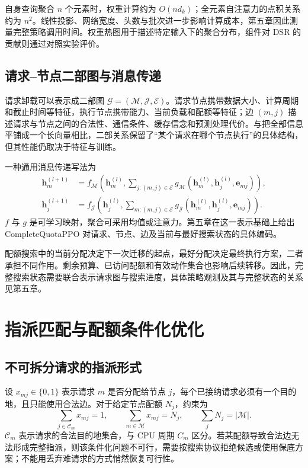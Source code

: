 自身查询聚合 $n$ 个元素时，权重计算约为 $O(nd_k)$；全元素自注意力的点积关系约为 $n^2$。线性投影、网络宽度、头数与批次进一步影响计算成本，第五章因此测量完整策略调用时间。权重热图用于描述特定输入下的聚合分布，组件对 DSR 的贡献则通过对照实验评价。

\subsection{请求--节点二部图与消息传递}
\label{sec:ch2-bipartite-graph}

请求卸载可以表示成二部图 $\mathcal G=(\mathcal M,\mathcal J,\mathcal E)$。请求节点携带数据大小、计算周期和截止时间等特征，执行节点携带能力、当前负载和配额等特征；边 $(m,j)$ 描述请求与节点之间的合法性、通信条件、缓存信念和预测处理代价。与把全部信息平铺成一个长向量相比，二部关系保留了“某个请求在哪个节点执行”的具体结构，但其性能仍取决于特征与训练。

一种通用消息传递写法为
\begin{align}
    \boldsymbol h_m^{(l+1)}&=f_{\mathcal M}\left(\boldsymbol h_m^{(l)},
       \sum_{j:(m,j)\in\mathcal E}g_{\mathcal M}(\boldsymbol h_m^{(l)},\boldsymbol h_j^{(l)},\boldsymbol e_{mj})\right),\\
    \boldsymbol h_j^{(l+1)}&=f_{\mathcal J}\left(\boldsymbol h_j^{(l)},
       \sum_{m:(m,j)\in\mathcal E}g_{\mathcal J}(\boldsymbol h_m^{(l)},\boldsymbol h_j^{(l)},\boldsymbol e_{mj})\right).
    \label{eq:ch2-message-passing}
\end{align}
$f$ 与 $g$ 是可学习映射，聚合可采用均值或注意力。第五章在这一表示基础上给出 CompleteQuotaPPO 对请求、节点、边及当前与最好搜索状态的具体编码。

配额搜索中的当前分配决定下一次迁移的起点，最好分配决定最终执行方案，二者承担不同作用。剩余预算、已访问配额和有效动作集合也影响后续转移。因此，完整搜索状态需要联合表示请求图与搜索进度，具体策略观测及其与完整状态的关系见第五章。

\section{指派匹配与配额条件化优化}
\label{sec:ch2-matching}

\subsection{不可拆分请求的指派形式}
\label{sec:ch2-assignment}

设 $x_{mj}\in\{0,1\}$ 表示请求 $m$ 是否分配给节点 $j$，每个已接纳请求必须有一个目的地，且只能使用合法边。对于给定节点配额 $N_j$，约束为
\begin{equation}
    \sum_{j\in\mathcal C_m}x_{mj}=1,\qquad
    \sum_{m\in\mathcal M}x_{mj}=N_j,\qquad
    \sum_jN_j=|\mathcal M|.
    \label{eq:ch2-assignment-constraints}
\end{equation}
$\mathcal C_m$ 表示请求的合法目的地集合，与 CPU 周期 $C_m$ 区分。若某配额导致合法边无法形成完整指派，则该条件化问题不可行，需要按搜索协议拒绝候选或使用保底方案；不能用丢弃难请求的方式悄然恢复可行性。

